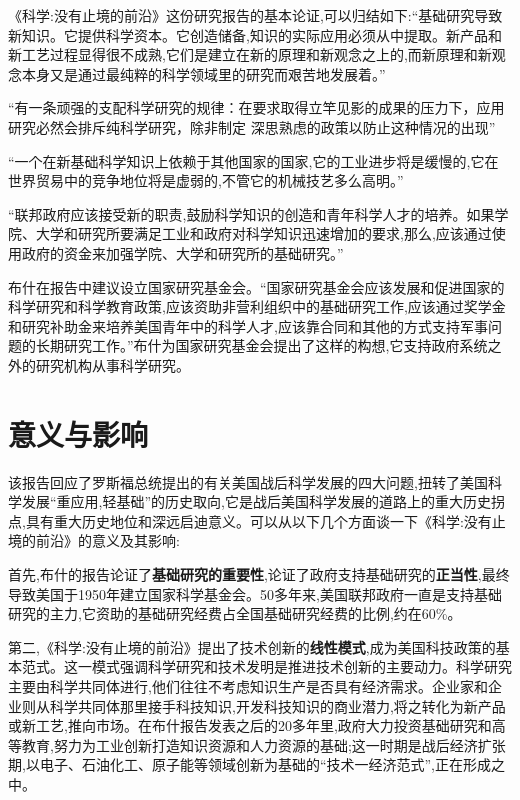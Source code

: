 《科学:没有止境的前沿》这份研究报告的基本论证,可以归结如下:“基础研究导致新知识。它提供科学资本。它创造储备,知识的实际应用必须从中提取。新产品和新工艺过程显得很不成熟,它们是建立在新的原理和新观念之上的,而新原理和新观念本身又是通过最纯粹的科学领域里的研究而艰苦地发展着。”\cite{ref1}

“有一条顽强的支配科学研究的规律：在要求取得立竿见影的成果的压力下，应用研究必然会排斥纯科学研究，除非制定
深思熟虑的政策以防止这种情况的出现”\cite{ref1}

“一个在新基础科学知识上依赖于其他国家的国家,它的工业进步将是缓慢的,它在世界贸易中的竞争地位将是虚弱的,不管它的机械技艺多么高明。”\cite{ref1}

“联邦政府应该接受新的职责,鼓励科学知识的创造和青年科学人才的培养。如果学院、大学和研究所要满足工业和政府对科学知识迅速增加的要求,那么,应该通过使用政府的资金来加强学院、大学和研究所的基础研究。”\cite{ref1}

布什在报告中建议设立国家研究基金会。“国家研究基金会应该发展和促进国家的科学研究和科学教育政策,应该资助非营利组织中的基础研究工作,应该通过奖学金和研究补助金来培养美国青年中的科学人才,应该靠合同和其他的方式支持军事问题的长期研究工作。”布什为国家研究基金会提出了这样的构想,它支持政府系统之外的研究机构从事科学研究。

\section{意义与影响}

该报告回应了罗斯福总统提出的有关美国战后科学发展的四大问题,扭转了美国科学发展“重应用,轻基础”的历史取向,它是战后美国科学发展的道路上的重大历史拐点,具有重大历史地位和深远启迪意义\cite{ref2}。可以从以下几个方面谈一下《科学:没有止境的前沿》的意义及其影响:

首先,布什的报告论证了\textbf{基础研究的重要性},论证了政府支持基础研究的\textbf{正当性},最终导致美国于1950年建立国家科学基金会。50多年来,美国联邦政府一直是支持基础研究的主力,它资助的基础研究经费占全国基础研究经费的比例,约在60\%。

第二,《科学:没有止境的前沿》提出了技术创新的\textbf{线性模式},成为美国科技政策的基本范式。这一模式强调科学研究和技术发明是推进技术创新的主要动力。科学研究主要由科学共同体进行,他们往往不考虑知识生产是否具有经济需求。企业家和企业则从科学共同体那里接手科技知识,开发科技知识的商业潜力,将之转化为新产品或新工艺,推向市场。在布什报告发表之后的20多年里,政府大力投资基础研究和高等教育,努力为工业创新打造知识资源和人力资源的基础;这一时期是战后经济扩张期,以电子、石油化工、原子能等领域创新为基础的“技术一经济范式”,正在形成之中。

